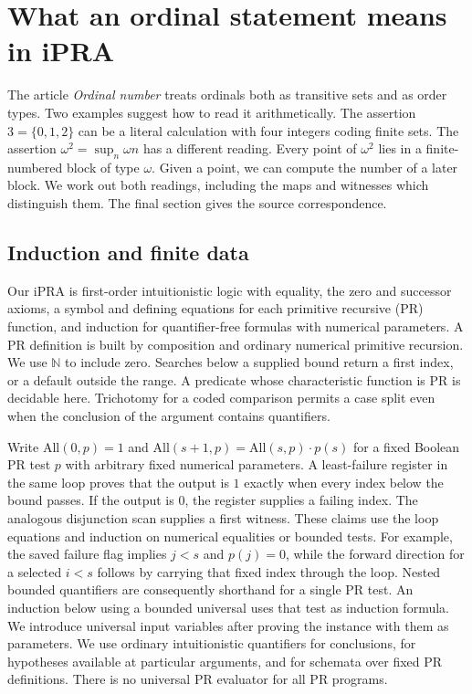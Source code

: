 \section{What an ordinal statement means in iPRA}
\label{sec:foundation}
The article \emph{Ordinal number} treats ordinals both as transitive sets and as order types. Two examples suggest how to read it arithmetically. The assertion $3=\{0,1,2\}$ can be a literal calculation with four integers coding finite sets. The assertion $\omega^2=\sup_n\omega n$ has a different reading. Every point of $\omega^2$ lies in a finite-numbered block of type $\omega$. Given a point, we can compute the number of a later block. We work out both readings, including the maps and witnesses which distinguish them. The final section gives the source correspondence.

\subsection{Induction and finite data}
Our iPRA is first-order intuitionistic logic with equality, the zero and successor axioms, a symbol and defining equations for each primitive recursive (PR) function, and induction for quantifier-free formulas with numerical parameters. A PR definition is built by composition and ordinary numerical primitive recursion. We use $\mathbb N$ to include zero. Searches below a supplied bound return a first index, or a default outside the range. A predicate whose characteristic function is PR is decidable here. Trichotomy for a coded comparison permits a case split even when the conclusion of the argument contains quantifiers.

Write $\mathrm{All}(0,p)=1$ and $\mathrm{All}(s+1,p)=\mathrm{All}(s,p)\cdot p(s)$ for a fixed Boolean PR test $p$ with arbitrary fixed numerical parameters. A least-failure register in the same loop proves that the output is $1$ exactly when every index below the bound passes. If the output is $0$, the register supplies a failing index. The analogous disjunction scan supplies a first witness. These claims use the loop equations and induction on numerical equalities or bounded tests. For example, the saved failure flag implies $j<s$ and $p(j)=0$, while the forward direction for a selected $i<s$ follows by carrying that fixed index through the loop. Nested bounded quantifiers are consequently shorthand for a single PR test. An induction below using a bounded universal uses that test as induction formula. We introduce universal input variables after proving the instance with them as parameters. We use ordinary intuitionistic quantifiers for conclusions, for hypotheses available at particular arguments, and for schemata over fixed PR definitions. There is no universal PR evaluator for all PR programs.

